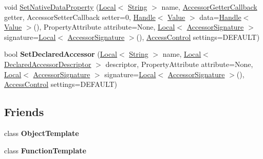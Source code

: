\begin{DoxyCompactItemize}
\item 
void \hyperlink{classv8_1_1_template_ae186b9e472ed7604cc9693c7b9540909}{Set\+Native\+Data\+Property} (\hyperlink{classv8_1_1_local}{Local}$<$ \hyperlink{classv8_1_1_string}{String} $>$ name, \hyperlink{namespacev8_a722613c87061708a4f1aa050d095f868}{Accessor\+Getter\+Callback} getter, Accessor\+Setter\+Callback setter=0, \hyperlink{classv8_1_1_handle}{Handle}$<$ \hyperlink{classv8_1_1_value}{Value} $>$ data=\hyperlink{classv8_1_1_handle}{Handle}$<$ \hyperlink{classv8_1_1_value}{Value} $>$(), Property\+Attribute attribute=None, \hyperlink{classv8_1_1_local}{Local}$<$ \hyperlink{classv8_1_1_accessor_signature}{Accessor\+Signature} $>$ signature=\hyperlink{classv8_1_1_local}{Local}$<$ \hyperlink{classv8_1_1_accessor_signature}{Accessor\+Signature} $>$(), \hyperlink{namespacev8_a31d8355cb043d7d2dda3f4a52760b64e}{Access\+Control} settings=D\+E\+F\+A\+U\+L\+T)
\item 
\hypertarget{classv8_1_1_template_a82a06b2a76a32883f2f756a919b2dee8}{}bool {\bfseries Set\+Declared\+Accessor} (\hyperlink{classv8_1_1_local}{Local}$<$ \hyperlink{classv8_1_1_string}{String} $>$ name, \hyperlink{classv8_1_1_local}{Local}$<$ \hyperlink{classv8_1_1_declared_accessor_descriptor}{Declared\+Accessor\+Descriptor} $>$ descriptor, Property\+Attribute attribute=None, \hyperlink{classv8_1_1_local}{Local}$<$ \hyperlink{classv8_1_1_accessor_signature}{Accessor\+Signature} $>$ signature=\hyperlink{classv8_1_1_local}{Local}$<$ \hyperlink{classv8_1_1_accessor_signature}{Accessor\+Signature} $>$(), \hyperlink{namespacev8_a31d8355cb043d7d2dda3f4a52760b64e}{Access\+Control} settings=D\+E\+F\+A\+U\+L\+T)\label{classv8_1_1_template_a82a06b2a76a32883f2f756a919b2dee8}

\end{DoxyCompactItemize}
\subsection*{Friends}
\begin{DoxyCompactItemize}
\item 
\hypertarget{classv8_1_1_template_a4d28646409234f556983be8a96c06424}{}class {\bfseries Object\+Template}\label{classv8_1_1_template_a4d28646409234f556983be8a96c06424}

\item 
\hypertarget{classv8_1_1_template_a334168ad1a5f39cf17b818ca3356aacd}{}class {\bfseries Function\+Template}\label{classv8_1_1_template_a334168ad1a5f39cf17b818ca3356aacd}

\end{DoxyCompactItemize}


